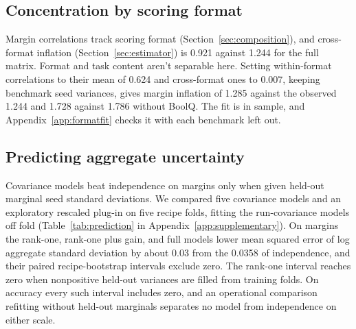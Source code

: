 
\subsection{Concentration by scoring format}
Margin correlations track scoring format (Section~\ref{sec:composition}), and cross-format inflation (Section~\ref{sec:estimator}) is 0.921 against 1.244 for the full matrix. Format and task content aren't separable here. Setting within-format correlations to their mean of 0.624 and cross-format ones to 0.007, keeping benchmark seed variances, gives margin inflation of 1.285 against the observed 1.244 and 1.728 against 1.786 without BoolQ. The fit is in sample, and Appendix~\ref{app:formatfit} checks it with each benchmark left out.

\subsection{Predicting aggregate uncertainty}
\label{sec:prediction}
Covariance models beat independence on margins only when given held-out marginal seed standard deviations. We compared five covariance models and an exploratory rescaled plug-in on five recipe folds, fitting the run-covariance models off fold (Table~\ref{tab:prediction} in Appendix~\ref{app:supplementary}). On margins the rank-one, rank-one plus gain, and full models lower mean squared error of log aggregate standard deviation by about 0.03 from the 0.0358 of independence, and their paired recipe-bootstrap intervals exclude zero. The rank-one interval reaches zero when nonpositive held-out variances are filled from training folds. On accuracy every such interval includes zero, and an operational comparison refitting without held-out marginals separates no model from independence on either scale.


